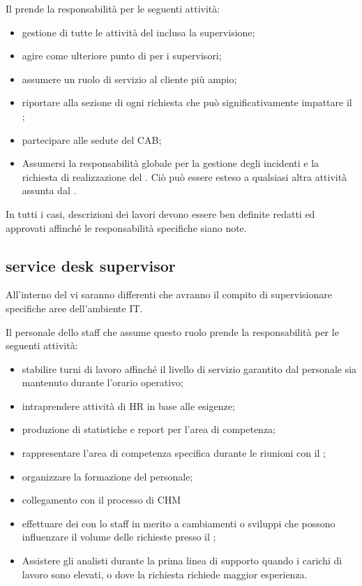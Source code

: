 Il  prende la responsabilità per le seguenti attività:

\begin{itemize}
\item{gestione di tutte le attività del  inclusa la supervisione;}
\item{agire come ulteriore punto di  per i supervisori;}
\item{assumere un ruolo di servizio al cliente più ampio;}
\item{riportare alla sezione di  ogni richiesta che può significativamente impattare il ;}
\item{partecipare alle sedute del \ac{CAB};}
\item{Assumersi la responsabilità globale per la gestione degli incidenti e la richiesta di realizzazione del . Ciò può essere esteso a qualsiasi altra attività assunta dal .}
\end{itemize}

In tutti i casi, descrizioni dei lavori devono essere ben definite redatti ed approvati affinché le responsabilità specifiche siano note.

\subsection[Service Desk Supervisor]{service desk supervisor}
\label{sd-sd-supervisor}
All'interno del  vi saranno differenti  che avranno il compito di supervisionare specifiche aree dell'ambiente \acs{IT}.

Il personale dello staff che assume questo ruolo prende la responsabilità per le seguenti attività:

\begin{itemize}
\item{stabilire turni di lavoro affinché il livello di servizio garantito dal personale sia mantenuto durante l'orario operativo;}
\item{intraprendere attività di \ac{HR} in base alle esigenze;}
\item{produzione di statistiche e report per l'area di competenza;}
\item{rappresentare l'area di competenza specifica durante le riunioni con il ;}
\item{organizzare la formazione del personale;}
\item{collegamento con il processo di \ac{CHM}}
\item{effettuare dei  con lo staff in merito a cambiamenti o sviluppi che possono influenzare il volume delle richieste presso il ;}
\item{Assistere gli analisti durante la prima linea di supporto quando i carichi di lavoro sono elevati, o dove la richiesta richiede maggior esperienza.}
\end{itemize}


